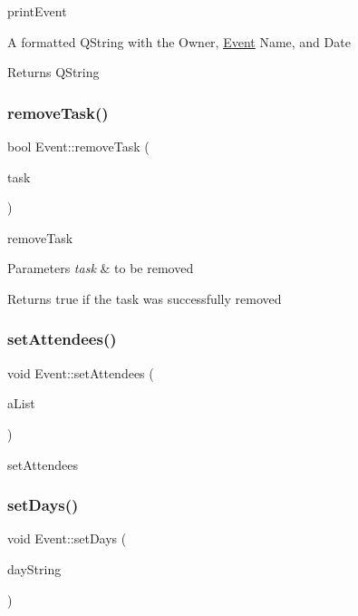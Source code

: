 print\+Event 

A formatted Q\+String with the Owner, \hyperlink{class_event}{Event} Name, and Date \begin{DoxyReturn}{Returns}
Q\+String 
\end{DoxyReturn}
\mbox{\label{class_event_a81270b85694de5ceaa79ae4e6588d000}} 
\subsubsection{\texorpdfstring{remove\+Task()}{removeTask()}}
{\footnotesize\ttfamily bool Event\+::remove\+Task (\begin{DoxyParamCaption}\item[{Q\+String}]{task }\end{DoxyParamCaption})}



remove\+Task 


\begin{DoxyParams}{Parameters}
{\em task} & to be removed \\
\hline
\end{DoxyParams}
\begin{DoxyReturn}{Returns}
true if the task was successfully removed 
\end{DoxyReturn}
\mbox{\label{class_event_af632e4550dcd4eb70c5a45c57af615b7}} 
\subsubsection{\texorpdfstring{set\+Attendees()}{setAttendees()}}
{\footnotesize\ttfamily void Event\+::set\+Attendees (\begin{DoxyParamCaption}\item[{Q\+List$<$ \hyperlink{classattendee}{attendee} $\ast$$>$}]{a\+List }\end{DoxyParamCaption})}



set\+Attendees 

\mbox{\label{class_event_a0cc103761f52f4a7c2e4d935c8e0809e}} 
\subsubsection{\texorpdfstring{set\+Days()}{setDays()}}
{\footnotesize\ttfamily void Event\+::set\+Days (\begin{DoxyParamCaption}\item[{Q\+String}]{day\+String }\end{DoxyParamCaption})}



